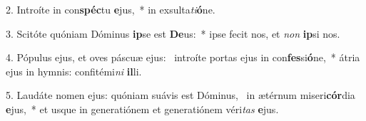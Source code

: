 2. Introíte in con\textbf{spéc}tu \textbf{e}jus,~*  in exsulta\textit{ti}\textbf{ó}ne.\

3. Scitóte quóniam Dóminus \textbf{ip}se est \textbf{De}us:~*  ipse fecit nos, et \textit{non} \textbf{ip}si nos.\

4. Pópulus ejus, et oves páscuæ ejus: \dag\  introíte portas ejus in con\textbf{fes}si\textbf{ó}ne,~*  átria ejus in hymnis: confitémi\textit{ni} \textbf{il}li.\

5. Laudáte nomen ejus: quóniam suávis est Dóminus, \dag\  in ætérnum miseri\textbf{cór}dia \textbf{e}jus,~*  et usque in generatiónem et generatiónem véri\textit{tas} \textbf{e}jus.\

